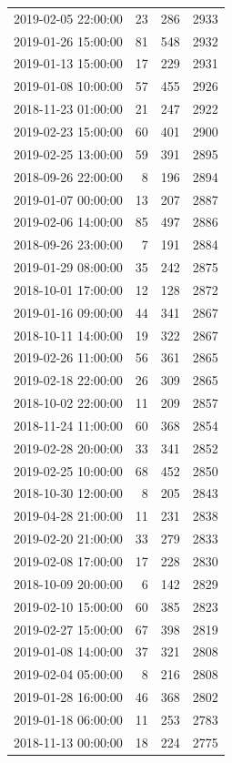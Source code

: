 \begin{tabular}{lrrr}
2019-02-05 22:00:00 & 23 & 286 & 2933 \\
2019-01-26 15:00:00 & 81 & 548 & 2932 \\
2019-01-13 15:00:00 & 17 & 229 & 2931 \\
2019-01-08 10:00:00 & 57 & 455 & 2926 \\
2018-11-23 01:00:00 & 21 & 247 & 2922 \\
2019-02-23 15:00:00 & 60 & 401 & 2900 \\
2019-02-25 13:00:00 & 59 & 391 & 2895 \\
2018-09-26 22:00:00 & 8 & 196 & 2894 \\
2019-01-07 00:00:00 & 13 & 207 & 2887 \\
2019-02-06 14:00:00 & 85 & 497 & 2886 \\
2018-09-26 23:00:00 & 7 & 191 & 2884 \\
2019-01-29 08:00:00 & 35 & 242 & 2875 \\
2018-10-01 17:00:00 & 12 & 128 & 2872 \\
2019-01-16 09:00:00 & 44 & 341 & 2867 \\
2018-10-11 14:00:00 & 19 & 322 & 2867 \\
2019-02-26 11:00:00 & 56 & 361 & 2865 \\
2019-02-18 22:00:00 & 26 & 309 & 2865 \\
2018-10-02 22:00:00 & 11 & 209 & 2857 \\
2018-11-24 11:00:00 & 60 & 368 & 2854 \\
2019-02-28 20:00:00 & 33 & 341 & 2852 \\
2019-02-25 10:00:00 & 68 & 452 & 2850 \\
2018-10-30 12:00:00 & 8 & 205 & 2843 \\
2019-04-28 21:00:00 & 11 & 231 & 2838 \\
2019-02-20 21:00:00 & 33 & 279 & 2833 \\
2019-02-08 17:00:00 & 17 & 228 & 2830 \\
2018-10-09 20:00:00 & 6 & 142 & 2829 \\
2019-02-10 15:00:00 & 60 & 385 & 2823 \\
2019-02-27 15:00:00 & 67 & 398 & 2819 \\
2019-01-08 14:00:00 & 37 & 321 & 2808 \\
2019-02-04 05:00:00 & 8 & 216 & 2808 \\
2019-01-28 16:00:00 & 46 & 368 & 2802 \\
2019-01-18 06:00:00 & 11 & 253 & 2783 \\
2018-11-13 00:00:00 & 18 & 224 & 2775 \\

\end{tabular}
